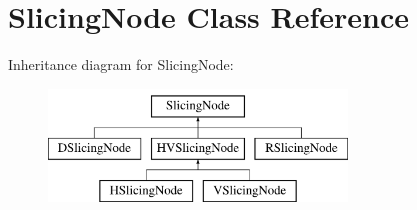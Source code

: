 \hypertarget{class_open_chams_1_1_slicing_node}{}\section{Slicing\+Node Class Reference}
\label{class_open_chams_1_1_slicing_node}
Inheritance diagram for Slicing\+Node\+:\begin{figure}[H]
\begin{center}
\leavevmode
\includegraphics[height=3.000000cm]{class_open_chams_1_1_slicing_node}
\end{center}
\end{figure}
